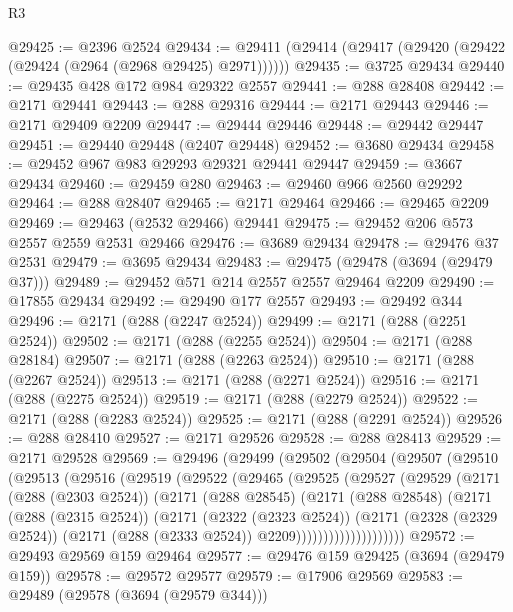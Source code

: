 \begin{lexlean}{R3}
\begin{coremodule}
@29425 := @2396 @2524
@29434 := @29411 (@29414 (@29417 (@29420 (@29422 (@29424 (@2964 (@2968 @29425) @2971))))))
@29435 := @3725 @29434
@29440 := @29435 @428 @172 @984 @29322 @2557
@29441 := @288 @28408
@29442 := @2171 @29441
@29443 := @288 @29316
@29444 := @2171 @29443
@29446 := @2171 @29409 @2209
@29447 := @29444 @29446
@29448 := @29442 @29447
@29451 := @29440 @29448 (@2407 @29448)
@29452 := @3680 @29434
@29458 := @29452 @967 @983 @29293 @29321 @29441 @29447
@29459 := @3667 @29434
@29460 := @29459 @280
@29463 := @29460 @966 @2560 @29292
@29464 := @288 @28407
@29465 := @2171 @29464
@29466 := @29465 @2209
@29469 := @29463 (@2532 @29466) @29441
@29475 := @29452 @206 @573 @2557 @2559 @2531 @29466
@29476 := @3689 @29434
@29478 := @29476 @37 @2531
@29479 := @3695 @29434
@29483 := @29475 (@29478 (@3694 (@29479 @37)))
@29489 := @29452 @571 @214 @2557 @2557 @29464 @2209
@29490 := @17855 @29434
@29492 := @29490 @177 @2557
@29493 := @29492 @344
@29496 := @2171 (@288 (@2247 @2524))
@29499 := @2171 (@288 (@2251 @2524))
@29502 := @2171 (@288 (@2255 @2524))
@29504 := @2171 (@288 @28184)
@29507 := @2171 (@288 (@2263 @2524))
@29510 := @2171 (@288 (@2267 @2524))
@29513 := @2171 (@288 (@2271 @2524))
@29516 := @2171 (@288 (@2275 @2524))
@29519 := @2171 (@288 (@2279 @2524))
@29522 := @2171 (@288 (@2283 @2524))
@29525 := @2171 (@288 (@2291 @2524))
@29526 := @288 @28410
@29527 := @2171 @29526
@29528 := @288 @28413
@29529 := @2171 @29528
@29569 := @29496
    (@29499
      (@29502
        (@29504
          (@29507
            (@29510
              (@29513
                (@29516
                  (@29519
                    (@29522
                      (@29465
                        (@29525
                          (@29527
                            (@29529
                              (@2171
                                (@288 (@2303 @2524))
                                (@2171
                                  (@288 @28545)
                                  (@2171
                                    (@288 @28548)
                                    (@2171
                                      (@288 (@2315 @2524))
                                      (@2171
                                        (@2322 (@2323 @2524))
                                        (@2171
                                          (@2328 (@2329 @2524))
                                          (@2171 (@288 (@2333 @2524)) @2209))))))))))))))))))))
@29572 := @29493 @29569 @159 @29464
@29577 := @29476 @159 @29425 (@3694 (@29479 @159))
@29578 := @29572 @29577
@29579 := @17906 @29569
@29583 := @29489 (@29578 (@3694 (@29579 @344)))

\end{coremodule}
\end{lexlean}
